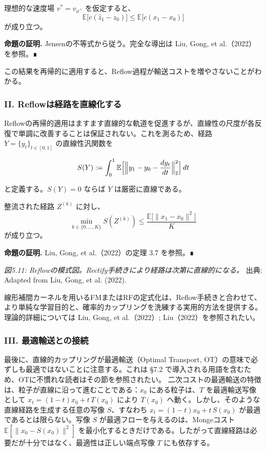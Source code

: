 \begin{propositionbox}[命題 5.4.1（Rectifyは輸送コストを減らし得る）]
理想的な速度場 $v^* = v_{\phi^\times}$ を仮定すると、
\[
\mathbb{E}\bigl[c(\hat{z}_1 - z_0)\bigr] \le \mathbb{E}\bigl[c(x_1 - x_0)\bigr]
\]
が成り立つ。
\end{propositionbox}


\textbf{命題の証明.}
Jensenの不等式から従う。完全な導出は Liu, Gong, et al.（2022）を参照。∎

この結果を再帰的に適用すると、Reflow過程が輸送コストを増やさないことがわかる。

\subsubsection*{II. Reflowは経路を直線化する}


Reflowの再帰的適用はますます直線的な軌道を促進するが、直線性の尺度が各反復で単調に改善することは保証されない。これを測るため、経路 $Y = \{y_t\}_{t\in[0,1]}$ の直線性汎関数を

\[
S(Y) := \int_0^1 \mathbb{E}\Bigl[\Bigl\|y_1 - y_0 - \frac{dy_t}{dt}\Bigr\|_2^2\Bigr]\, dt
\]


と定義する。$S(Y) = 0$ ならば $Y$ は厳密に直線である。

\begin{propositionbox}[命題 5.4.2（Reflowは確率的経路を直線化する）]
整流された経路 $Z^{(k)}$ に対し、
\[
\min_{k\in\{0,\ldots,K\}} S(Z^{(k)}) \le \frac{\mathbb{E}\bigl[\|x_1 - x_0\|^2\bigr]}{K}
\]
が成り立つ。
\end{propositionbox}


\textbf{命題の証明.}
Liu, Gong, et al.（2022）の定理 3.7 を参照。∎



\emph{図5.11: Reflowの模式図。Rectify手続きにより経路は次第に直線的になる。}
出典: Adapted from Liu, Gong, et al. (2022).

線形補間カーネルを用いるFMまたはRFの定式化は、Reflow手続きと合わせて、より単純な学習目的と、確率的カップリングを洗練する実用的方法を提供する。理論的詳細については Liu, Gong, et al.（2022）; Liu（2022）を参照されたい。

\subsubsection*{III. 最適輸送との接続}


最後に、直線的カップリングが最適輸送（Optimal Transport, OT）の意味で必ずしも最適ではないことに注意する。これは §7.2 で導入される用語を含むため、OTに不慣れな読者はその節を参照されたい。
二次コストの最適輸送の特徴は、粒子が直線に沿って進むことである：$x_0$ にある粒子は、$T$ を最適輸送写像として $x_t = (1-t)x_0 + t\, T(x_0)$ により $T(x_0)$ へ動く。しかし、そのような直線経路を生成する任意の写像 $S$、すなわち $x_t = (1-t)x_0 + t\, S(x_0)$ が最適であるとは限らない。写像 $S$ が最適フローを与えるのは、Mongeコスト $\mathbb{E}[\|x_0 - S(x_0)\|^2]$ を最小化するときだけである。したがって直線経路は必要だが十分ではなく、最適性は正しい端点写像 $T$ にも依存する。

